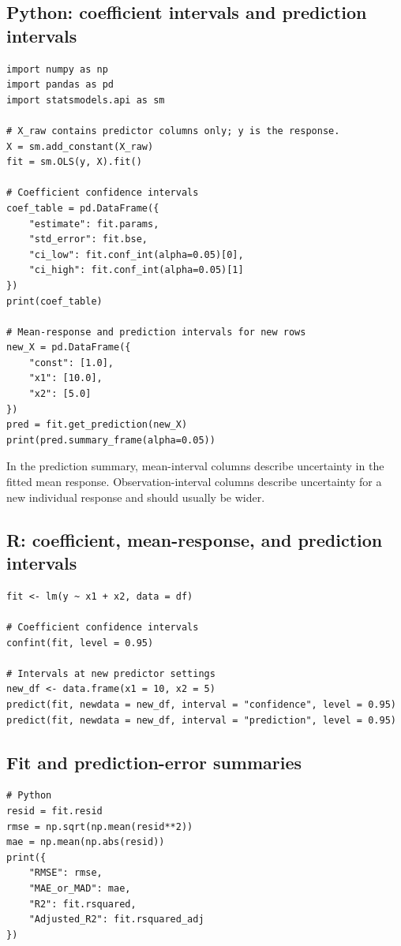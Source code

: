 \subsection*{Python: coefficient intervals and prediction intervals}

\begin{verbatim}
import numpy as np
import pandas as pd
import statsmodels.api as sm

# X_raw contains predictor columns only; y is the response.
X = sm.add_constant(X_raw)
fit = sm.OLS(y, X).fit()

# Coefficient confidence intervals
coef_table = pd.DataFrame({
    "estimate": fit.params,
    "std_error": fit.bse,
    "ci_low": fit.conf_int(alpha=0.05)[0],
    "ci_high": fit.conf_int(alpha=0.05)[1]
})
print(coef_table)

# Mean-response and prediction intervals for new rows
new_X = pd.DataFrame({
    "const": [1.0],
    "x1": [10.0],
    "x2": [5.0]
})
pred = fit.get_prediction(new_X)
print(pred.summary_frame(alpha=0.05))
\end{verbatim}

In the prediction summary, mean-interval columns describe uncertainty in the fitted mean response.  Observation-interval columns describe uncertainty for a new individual response and should usually be wider.

\subsection*{R: coefficient, mean-response, and prediction intervals}

\begin{verbatim}
fit <- lm(y ~ x1 + x2, data = df)

# Coefficient confidence intervals
confint(fit, level = 0.95)

# Intervals at new predictor settings
new_df <- data.frame(x1 = 10, x2 = 5)
predict(fit, newdata = new_df, interval = "confidence", level = 0.95)
predict(fit, newdata = new_df, interval = "prediction", level = 0.95)
\end{verbatim}

\subsection*{Fit and prediction-error summaries}

\begin{verbatim}
# Python
resid = fit.resid
rmse = np.sqrt(np.mean(resid**2))
mae = np.mean(np.abs(resid))
print({
    "RMSE": rmse,
    "MAE_or_MAD": mae,
    "R2": fit.rsquared,
    "Adjusted_R2": fit.rsquared_adj
})
\end{verbatim}

